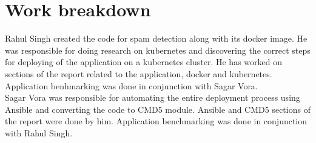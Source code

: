 \documentclass[9pt,twocolumn,twoside]{../../styles/osajnl}
\begin{document}
{\begin{minipage}[t][3.2cm][t]{1.0\columnwidth}
\end{minipage}
\endgroup

\section{Work breakdown}
Rahul Singh created the code for spam detection along with its docker
image. He was responsible for doing research on kubernetes and
discovering the correct steps for deploying of the application on a
kubernetes cluster. He has worked on sections of the report related to
the application, docker and kubernetes. Application benhmarking was
done in conjunction with Sagar Vora.\\

\noindent
Sagar Vora was responsible for automating the entire deployment
process using Ansible and converting the code to CMD5 module. Ansible
and CMD5 sections of the report were done by him. Application
benchmarking was done in conjunction with Rahul Singh.
\end{document}
